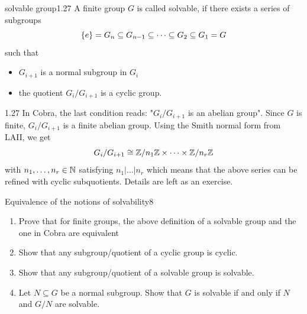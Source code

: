\documentclass[twoside = false,	%
		headsepline,		%
		parskip = true,
		]{scrbook}						%
\begin{document}
        \begin{definition}{solvable group}{1.27}
            A finite group $G$ is called solvable, if there exists a series of subgroups
            $$\left\{ e\right\} = G_n\subseteq G_{n-1}\subseteq \dots \subseteq G_2\subseteq G_1= G$$
            such that \begin{itemize}
                \item $G_{i+1}$ is a normal subgroup in $G_i$
                \item the quotient $G_i/G_{i+1}$ is a cyclic group.
            \end{itemize}
        \end{definition}
        \begin{remark}{}{1.27}
            In Cobra, the last condition reads: "$G_i/G_{i+1}$ is an abelian group". Since $G$ is finite, $G_i/G_{i+1}$ is a finite abelian group. Using the Smith normal form from LAII, we get
            $$G_i/G_{i+1} \cong \mathbb Z/n_1\mathbb Z \times \dots \times \mathbb Z/n_r\mathbb Z$$ with $n_1,\dots, n_r\in\mathbb N$ satisfying $n_1|\dots|n_r$ which means that the above series can be refined with cyclic subquotients. Details are left as an exercise.
        \end{remark}
        \begin{exercise}{Equivalence of the notions of solvability}{8}
            \begin{enumerate}
                \item Prove that for finite groups, the above definition of a solvable group and the one in Cobra are equivalent
                \item Show that any subgroup/quotient of a cyclic group is cyclic.
                \item Show that any subgroup/quotient of a solvable group is solvable.
                \item Let $N\subseteq G$ be a normal subgroup. Show that $G$ is solvable if and only if $N$ and $G/N$ are solvable.
            \end{enumerate}
        \end{exercise}
\end{document}
